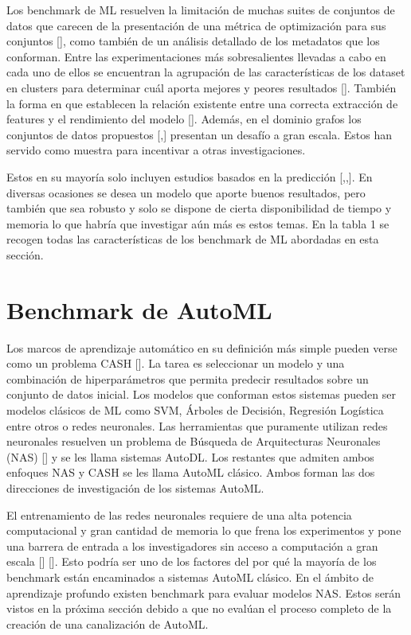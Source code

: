 Los benchmark de ML resuelven la limitación de muchas suites de conjuntos de datos que carecen de la presentación de una métrica de optimización para sus conjuntos 
[\cite{44}], como también de un análisis detallado de los metadatos que los conforman. 
Entre las experimentaciones más sobresalientes llevadas a cabo en cada uno de ellos se encuentran la agrupación de las características de los dataset 
en clusters para determinar cuál aporta mejores y peores resultados [\cite{2}]. También la forma en que establecen la relación existente entre una correcta 
extracción de features y el rendimiento del modelo [\cite{4}]. Además, en el dominio grafos los conjuntos de datos propuestos [\cite{5},\cite{6}] presentan un desafío 
a gran escala. Estos han servido como muestra para incentivar a otras investigaciones.

Estos en su mayoría solo incluyen estudios basados en la predicción [\cite{4},\cite{3},\cite{2}]. En diversas ocasiones se desea un modelo que aporte buenos 
resultados, pero también que sea robusto y solo se dispone de cierta disponibilidad de tiempo y memoria lo que habría que investigar aún más es estos temas. 
En la tabla 1 se recogen todas las características de los benchmark de ML abordadas en esta sección. 

\section{Benchmark de AutoML}\label{section:bench_AutoML}

Los marcos de aprendizaje automático en su definición más simple pueden verse como un problema CASH [\cite{37}]. La tarea es seleccionar un modelo y 
una combinación de hiperparámetros que permita predecir resultados sobre un conjunto de datos inicial. Los modelos que conforman estos sistemas pueden 
ser modelos clásicos de ML como SVM, Árboles de Decisión, Regresión Logística entre otros o redes neuronales. Las herramientas que puramente utilizan redes neuronales
resuelven un problema de Búsqueda de Arquitecturas Neuronales (NAS) [\cite{35}] y se les llama sistemas AutoDL. Los restantes que admiten ambos enfoques NAS y CASH se 
les llama AutoML clásico. Ambos forman las dos direcciones de investigación de los sistemas AutoML.

El entrenamiento de las redes neuronales requiere de una alta potencia computacional y gran cantidad de memoria lo que frena los experimentos y pone una barrera de 
entrada a los investigadores sin acceso a computación a gran escala [\cite{49}] [\cite{46}]. Esto podría ser uno de los factores del por qué la mayoría de los 
benchmark están encaminados a sistemas AutoML clásico. En el ámbito de aprendizaje profundo existen benchmark para evaluar modelos NAS. Estos serán vistos en la 
próxima sección debido a que no evalúan el proceso completo de la creación de una canalización de AutoML.

